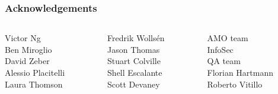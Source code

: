 \documentclass[aspectratio=169]{beamer}
\begin{document}
{
\begin{frame}
\frametitle{Acknowledgements}
   \begin{columns}
     \begin{column}{.33\linewidth}
Victor Ng\\
Ben Miroglio\\
David Zeber\\
Alessio Placitelli\\
Laura Thomson
     \end{column}
     \begin{column}{.33\linewidth}
Fredrik Wollsén\\
Jason Thomas\\
Stuart Colville\\
Shell Escalante\\
Scott Devaney\\
     \end{column}
     \begin{column}{.33\linewidth}
AMO team\\
InfoSec\\
QA team\\
Florian Hartmann\\
Roberto Vitillo
     \end{column}
     
   \end{columns}

%
\end{frame}
}

\end{document}
